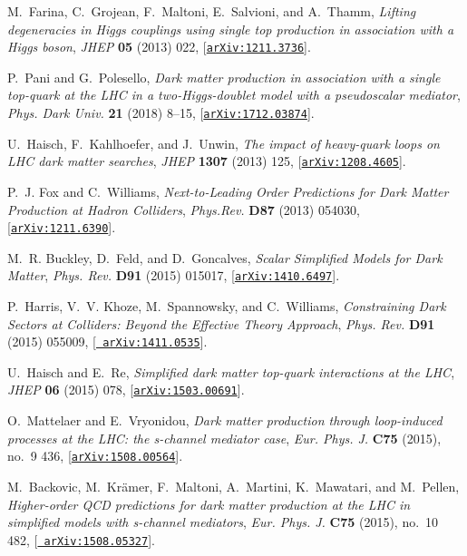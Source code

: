 \documentclass[a4paper, 11pt,notoc]{article}
\begin{document}
\begin{thebibliography}{100}
M.~Farina, C.~Grojean, F.~Maltoni, E.~Salvioni, and A.~Thamm, {\it {Lifting
  degeneracies in Higgs couplings using single top production in association
  with a Higgs boson}},  {\em JHEP} {\bf 05} (2013) 022,
  [\href{http://arxiv.org/abs/1211.3736}{{\tt arXiv:1211.3736}}].

P.~Pani and G.~Polesello, {\it {Dark matter production in association with a
  single top-quark at the LHC in a two-Higgs-doublet model with a pseudoscalar
  mediator}},  {\em Phys. Dark Univ.} {\bf 21} (2018) 8--15,
  [\href{http://arxiv.org/abs/1712.03874}{{\tt arXiv:1712.03874}}].

U.~Haisch, F.~Kahlhoefer, and J.~Unwin, {\it {The impact of heavy-quark loops
  on LHC dark matter searches}},  {\em JHEP} {\bf 1307} (2013) 125,
  [\href{http://arxiv.org/abs/1208.4605}{{\tt arXiv:1208.4605}}].

P.~J. Fox and C.~Williams, {\it {Next-to-Leading Order Predictions for Dark
  Matter Production at Hadron Colliders}},  {\em Phys.Rev.} {\bf D87} (2013)
  054030, [\href{http://arxiv.org/abs/1211.6390}{{\tt arXiv:1211.6390}}].

M.~R. Buckley, D.~Feld, and D.~Goncalves, {\it {Scalar Simplified Models for
  Dark Matter}},  {\em Phys. Rev.} {\bf D91} (2015) 015017,
  [\href{http://arxiv.org/abs/1410.6497}{{\tt arXiv:1410.6497}}].

P.~Harris, V.~V. Khoze, M.~Spannowsky, and C.~Williams, {\it {Constraining Dark
  Sectors at Colliders: Beyond the Effective Theory Approach}},  {\em Phys.
  Rev.} {\bf D91} (2015) 055009, [\href{http://arxiv.org/abs/1411.0535}{{\tt
  arXiv:1411.0535}}].

U.~Haisch and E.~Re, {\it {Simplified dark matter top-quark interactions at the
  LHC}},  {\em JHEP} {\bf 06} (2015) 078,
  [\href{http://arxiv.org/abs/1503.00691}{{\tt arXiv:1503.00691}}].

O.~Mattelaer and E.~Vryonidou, {\it {Dark matter production through
  loop-induced processes at the LHC: the s-channel mediator case}},  {\em Eur.
  Phys. J.} {\bf C75} (2015), no.~9 436,
  [\href{http://arxiv.org/abs/1508.00564}{{\tt arXiv:1508.00564}}].

M.~Backovic, M.~Kr{\"a}mer, F.~Maltoni, A.~Martini, K.~Mawatari, and M.~Pellen,
  {\it {Higher-order QCD predictions for dark matter production at the LHC in
  simplified models with s-channel mediators}},  {\em Eur. Phys. J.} {\bf C75}
  (2015), no.~10 482, [\href{http://arxiv.org/abs/1508.05327}{{\tt
  arXiv:1508.05327}}].


\end{thebibliography}
\end{document}
